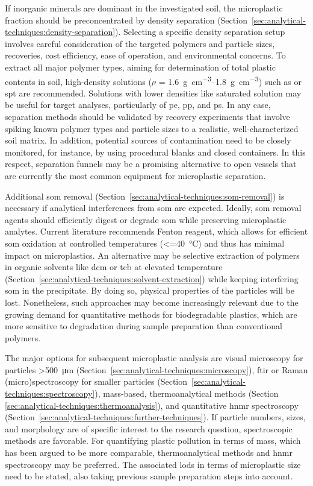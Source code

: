 If inorganic minerals are dominant in the investigated soil, the microplastic fraction should be preconcentrated by density separation
(Section~\ref{sec:analytical-techniques:density-separation}). Selecting a specific density separation setup involves careful consideration of the targeted polymers and particle sizes, recoveries, cost efficiency, ease of operation, and environmental concerns. To extract all major polymer types, aiming for determination of total plastic contents in soil, high-density solutions ($\rho$ = \SIrange{1.6}{1.8}{\gram\per\cubic\centi\meter})
such as  or \ac{spt} are recommended. Solutions with lower densities like saturated  solution may be useful for target analyses, particularly of \ac{pe}, \ac{pp}, and \ac{ps}. In any case, separation methods should be validated by recovery experiments that involve spiking known polymer types and particle sizes to a realistic,
well-characterized soil matrix. In addition, potential sources of contamination need to be closely monitored, for instance, by using procedural blanks and closed containers. In this respect, separation funnels may be a promising alternative to open vessels that are currently the most common equipment for microplastic separation.

Additional \ac{som} removal (Section~\ref{sec:analytical-techniques:som-removal}) is necessary if analytical interferences from \ac{som} are expected. Ideally,
\ac{som} removal agents should efficiently digest or degrade \ac{som} while preserving microplastic analytes. Current literature recommends Fenton reagent, which allows for efficient \ac{som} oxidation at controlled temperatures (\SI{<=40}{\degreeCelsius}) and thus has minimal impact on microplastics. An alternative may be selective extraction of polymers in organic solvents like \ac{dcm} or \ac{tcb} at elevated temperature
(Section~\ref{sec:analytical-techniques:solvent-extraction}) while keeping interfering \ac{som}
in the precipitate. By doing so, physical properties of the particles will be lost. Nonetheless, such approaches may become increasingly relevant due to the growing demand for quantitative methods for biodegradable plastics, which are more sensitive to degradation during sample preparation than conventional polymers.

The major options for subsequent microplastic analysis are visual microscopy for particles \SI{>500}{\micro\meter}
(Section~\ref{sec:analytical-techniques:microscopy}), \ac{ftir} or Raman
(micro)spectroscopy for smaller particles
(Section~\ref{sec:analytical-techniques:spectroscopy}), mass-based,
thermoanalytical methods (Section \ref{sec:analytical-techniques:thermoanalysis}), and quantitative \ac{hnmr} spectroscopy (Section~\ref{sec:analytical-techniques:further-techniques}). If particle numbers, sizes, and morphology are of specific interest to the research question, spectroscopic methods are favorable. For quantifying plastic pollution in terms of mass, which has been argued to be more comparable, thermoanalytical methods and \ac{hnmr} spectroscopy may be preferred. The associated \acp{lod} in terms of microplastic size need to be stated, also taking previous sample preparation steps into account.

